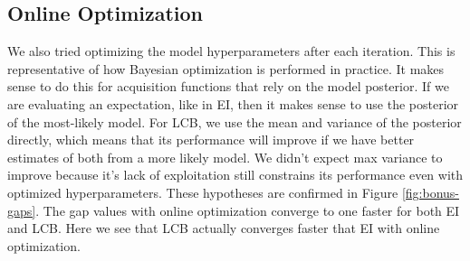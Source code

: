\documentclass[11pt]{article}
\numberwithin{equation}{section}
\begin{document}
\subsection*{Online Optimization}
We also tried optimizing the model hyperparameters after each iteration. This
is representative of how Bayesian optimization is performed in practice. It
makes sense to do this for acquisition functions that rely on the model posterior. If we are evaluating an expectation, like in EI, then it makes sense to use the posterior of the most-likely model. For LCB, we use the mean and variance of the posterior directly, which means that its performance will improve if we have better estimates of both from a more likely model. We didn't expect max variance to improve because it's lack of exploitation still constrains its performance even with optimized hyperparameters. These hypotheses are confirmed in Figure \ref{fig:bonus-gaps}. The gap values with online optimization converge to one faster for both EI and LCB. Here we see that LCB actually converges faster that EI with online optimization.
\end{document}
